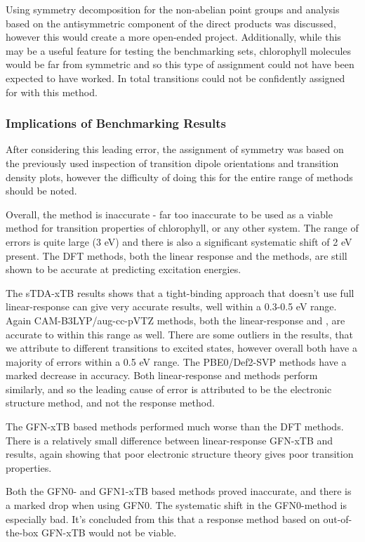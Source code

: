 Using symmetry decomposition for the non-abelian point groups and analysis based 
on the antisymmetric component of the direct products was discussed, however this
would create a more open-ended project. Additionally, while this may be a useful
feature for testing the benchmarking sets, chlorophyll molecules would be far from
symmetric and so this type of assignment could not have been expected to have worked. 
In total transitions could not be confidently assigned for \dscf with this method.

\subsubsection{Implications of Benchmarking Results}
\label{subsubsec:imp_of_benchmarking}

After considering this leading error, the assignment of symmetry was based on the
previously used inspection of transition dipole orientations and transition density
plots, however the difficulty of doing this for the entire range of methods should
be noted.

Overall, the \dxtb method is inaccurate - far too inaccurate to be used as a 
viable method for transition properties of chlorophyll, or any other system.
The range of errors is quite large (3 eV) and there is also a significant systematic
shift of 2 eV present. The DFT methods, both the linear response and the
\dscf methods, are still shown to be accurate at predicting excitation energies.

The sTDA-xTB results shows that a tight-binding approach that doesn't use full
linear-response can give very accurate results, well within a 0.3-0.5 eV range.
Again CAM-B3LYP/aug-cc-pVTZ methods, both the linear-response and \dscf, are 
accurate to within this range as well. There are some outliers in the \dscf results, that 
we attribute to different transitions to excited states, however overall both 
have a majority of errors within a 0.5 eV range. The PBE0/Def2-SVP methods have a
marked decrease in accuracy. Both linear-response and \dscf methods perform similarly,
and so the leading cause of error is attributed to be the electronic structure method,
and not the response method.

The GFN-xTB based methods performed much worse than the DFT methods. There is a
relatively small difference between linear-response GFN-xTB and \dxtb results, again
showing that poor electronic structure theory gives poor transition properties.

Both the GFN0- and GFN1-xTB based methods proved inaccurate, and there is a marked
drop when using GFN0. The systematic shift in the GFN0-\dxtb method is especially
bad. It's concluded from this that a response method based on out-of-the-box GFN-xTB would
not be viable.

